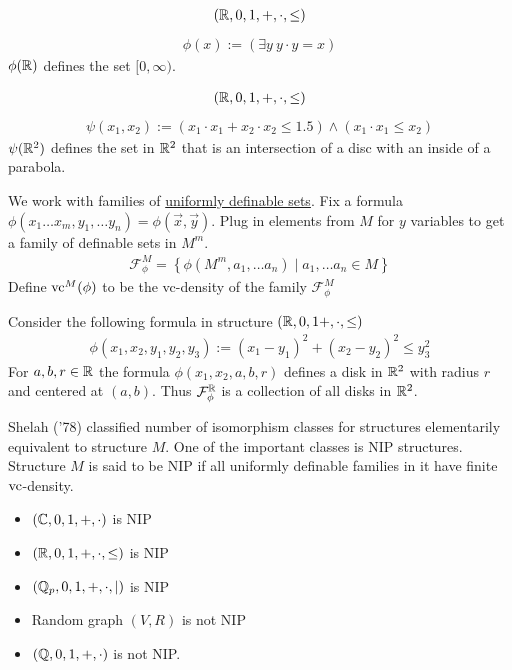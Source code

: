 \documentclass{beamer}
\newcommand{\F}{\mathcal F}
\newcommand{\curly}[1]{\left\{ #1 \right\}}
\newcommand{\paren}[1]{\left( #1 \right)}
\newcommand{\defn}{\underline}
\begin{document}
\begin{frame}
	\begin{align*}
		(\mathbb{R}, 0, 1, +, \cdot, \leq)
	\end{align*}
	\begin{align*}
		\phi(x) := \paren{\exists y \ y \cdot y = x}
	\end{align*}
	$\phi(\mathbb{R})$ defines the set $[0, \infty)$.
\end{frame}

\begin{frame}
	\begin{align*}
		(\mathbb{R}, 0, 1, +, \cdot, \leq)
	\end{align*}
	\begin{align*}
		\psi(x_1, x_2) := (x_1 \cdot x_1 + x_2 \cdot x_2 \leq 1.5) \wedge (x_1\cdot x_1 \leq x_2)
	\end{align*}
	$\psi(\mathbb{R}^2)$ defines the set in $\mathbb{R}^2$ that is an intersection of a disc with an inside of a parabola.
\end{frame}

\begin{frame}
	We work with families of \defn{uniformly definable sets}.
	Fix a formula $\phi(x_1 \ldots x_m, y_1, \ldots y_n) = \phi(\vec x, \vec y)$.
	Plug in elements from $M$ for $y$ variables to get a family of definable sets in $M^m$.
	\begin{align*}
		\F^M_\phi = \curly{\phi(M^m, a_1, \ldots a_n) \mid a_1, \ldots a_n \in M}
	\end{align*}
	Define $\operatorname{vc}^M(\phi)$ to be the vc-density of the family $\F^M_\phi$ \\
\end{frame}

\begin{frame}
	\begin{Example}
		Consider the following formula in structure $(\mathbb{R}, 0, 1 +, \cdot, \leq)$
		\begin{align*}
			\phi(x_1, x_2, y_1, y_2, y_3) := (x_1 - y_1)^2 + (x_2 - y_2)^2 \leq y_3^2
		\end{align*}
		For $a,b,r \in \mathbb{R}$ the formula $\phi(x_1, x_2, a, b, r)$ defines a disk in $\mathbb{R}^2$ with radius $r$ and centered at $(a,b)$.
		Thus $\F^\R_\phi$ is a collection of all disks in $\mathbb{R}^2$.
	\end{Example}
\end{frame}

\begin{frame}
	Shelah ('78) classified number of isomorphism classes for structures elementarily equivalent to structure $M$.
	One of the important classes is NIP structures.
	Structure $M$ is said to be NIP if all uniformly definable families in it have finite $\operatorname{vc}$-density.
	\begin{itemize}
		\item $(\mathbb{C}, 0, 1, +, \cdot)$ is NIP
		\item $(\mathbb{R}, 0, 1, +, \cdot, \leq)$ is NIP
		\item $(\mathbb{Q}_p, 0, 1, +, \cdot, \mid)$ is NIP
		\item Random graph $(V, R)$ is not NIP
		\item $(\mathbb{Q}, 0, 1, +, \cdot)$ is not NIP.
	\end{itemize}
\end{frame}
\end{document}
